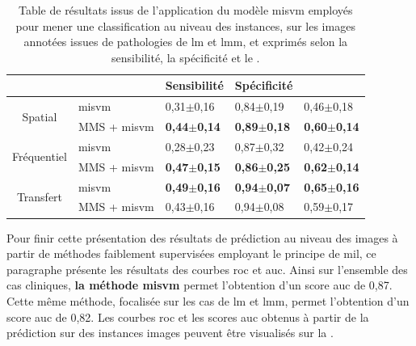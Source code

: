 \begin{table}[H]
    \centering
    \begin{tabular}{cllll}
        \toprule
        \multicolumn{1}{l}{}         &                      & Sensibilité               & Spécificité               & \Fscore{}                 \\ \midrule
        \multirow{2}{*}{Spatial}     & \gls{misvm}          & 0,31$\pm$0,16             & 0,84$\pm$0,19             & 0,46$\pm$0,18             \\
                                     & MMS + \gls{misvm}    & \textbf{0,44$\pm$0,14}    & \textbf{0,89$\pm$0,18}    & \textbf{0,60$\pm$0,14}    \\ \midrule
        \multirow{2}{*}{Fréquentiel} & \gls{misvm}          & 0,28$\pm$0,23             & 0,87$\pm$0,32             & 0,42$\pm$0,24             \\
                                     & MMS + \gls{misvm}    & \textbf{0,47$\pm$0,15}    & \textbf{0,86$\pm$0,25}    & \textbf{0,62$\pm$0,14}    \\ \midrule
        \multirow{2}{*}{Transfert}   & \gls{misvm}          & \textbf{0,49$\pm$0,16}    & \textbf{0,94$\pm$0,07}    & \textbf{0,65$\pm$0,16}    \\
                                     & MMS + \gls{misvm}    & 0,43$\pm$0,16             & 0,94$\pm$0,08             & 0,59$\pm$0,17             \\ \bottomrule
    \end{tabular}
    \caption{Table de résultats issus de l'application du modèle \gls{misvm} employés pour mener une classification au niveau des instances, sur les images annotées issues de pathologies de \gls{lm} et \gls{lmm}, et exprimés selon la sensibilité, la spécificité et le \fscore{}.}
    \label{tab:results_lesion_classification_weakly_image_lm}
\end{table}

Pour finir cette présentation des résultats de prédiction au niveau des images à partir de méthodes faiblement supervisées employant le principe de \gls{mil}, ce paragraphe présente les résultats des courbes \gls{roc} et \gls{auc}. Ainsi sur l'ensemble des cas cliniques, \textbf{la méthode \gls{misvm}} permet l'obtention d'un score \gls{auc} de 0,87. Cette même méthode, focalisée sur les cas de \gls{lm} et \gls{lmm}, permet l'obtention d'un score \gls{auc} de 0,82. Les courbes \gls{roc} et les scores \gls{auc} obtenus à partir de la prédiction sur des instances images peuvent être visualisés sur la .\par


